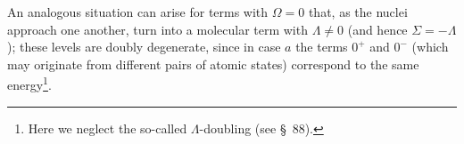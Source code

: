 An analogous situation can arise for terms with $\Omega=0$ that, as the nuclei approach one another, turn into a molecular term with $\Lambda\ne0$ (and hence $\Sigma=-\Lambda$); these levels are doubly degenerate, since in case $a$ the terms $0^+$ and $0^-$ (which may originate from different pairs of atomic states) correspond to the same energy\footnote{Here we neglect the so-called $\Lambda$-doubling (see \S~88).}.
